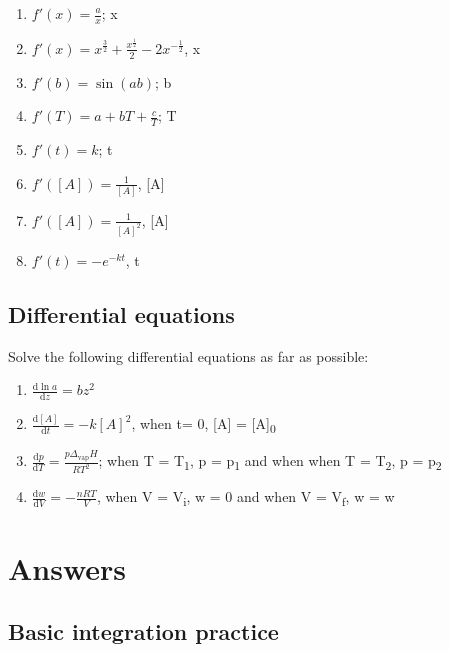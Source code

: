 \documentclass[
]{book}
\providecommand{\tightlist}{%
  \setlength{\itemsep}{0pt}\setlength{\parskip}{0pt}}
\begin{document}
\begin{enumerate}
\def\labelenumi{\arabic{enumi}.}
\tightlist
\item
  \(f'(x) = \frac{a}{x}\); x
\item
  \(f'(x) = x^\frac{3}{2}+ \frac{x^\frac{1}{2}}{2} - 2x^{-\frac{1}{2}}\), x
\item
  \(f'(b) = \sin (ab)\); b
\item
  \(f'(T) = a + bT + \frac{c}{T}\); T
\item
  \(f'(t) = k\); t
\item
  \(f'([A]) = \frac{1}{[A]}\), {[}A{]}
\item
  \(f'([A]) = \frac{1}{[A]^2}\), {[}A{]}
\item
  \(f'(t) = -e^{-kt}\), t
\end{enumerate}

\hypertarget{differential-equations}{%
\subsection{Differential equations}\label{differential-equations}}

Solve the following differential equations as far as possible:

\begin{enumerate}
\def\labelenumi{\arabic{enumi}.}
\tightlist
\item
  \(\frac{\textrm{d}\ln a}{\textrm{d}z}= bz^2\)
\item
  \(\frac{\textrm{d}[A]}{\textrm{d}t} = -k[A]^2\), when t= 0, {[}A{]} = {[}A{]}\textsubscript{0}
\item
  \(\frac{\textrm{d}p}{\textrm{d}T}=\frac{p\Delta_{\textrm{vap}}H}{RT^2}\); when T = T\textsubscript{1}, p = p\textsubscript{1} and when when T = T\textsubscript{2}, p = p\textsubscript{2}
\item
  \(\frac{\textrm{d}w}{\textrm{d}V}= -\frac{nRT}{V}\), when V = V\textsubscript{i}, w = 0 and when V = V\textsubscript{f}, w = w
\end{enumerate}

\hypertarget{sec:Answers6}{%
\section{Answers}\label{sec:Answers6}}

\hypertarget{basic-integration-practice-1}{%
\subsection{Basic integration practice}\label{basic-integration-practice-1}}
\end{document}

